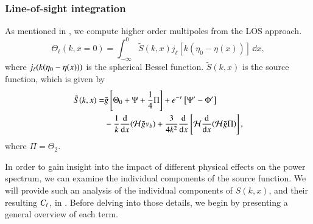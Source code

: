 \subsubsection{Line-of-sight integration}\label{sssec:M4:theory:line_of_sight_integration}
As mentioned in , we compute higher order multipoles from the LOS approach. 
\begin{equation} \label{eq:M4:theory:Theta_ell_LOS_integration}
    \Theta_\ell(k,x=0) = \int_{-\infty}^0 \tilde{S}(k,x) j_\ell [k(\eta_0 - \eta(x))]\,\dd x, 
\end{equation}
where $j_\ell(k(\eta_0-\eta(x)))$ is the spherical Bessel function. $\tilde{S}(k,x)$ is the source function, which is given by 
\begin{equation} \label{eq:M4:theory:source_function_LOS}
    \begin{split}
        \tilde{S}(k,x) =& \tilde{g} \left[ \Theta_0 + \Psi + \frac{1}{4} \Pi \right] + e^{-\tau}\left[ \Psi' - \Phi' \right] \\
        & - \frac{1}{k}\dv{x}(\mathcal{H} \tilde{g} v_b) + \frac{3}{4k^2}\dv{x}\left[ \mathcal{H} \dv{x}(\mathcal{H}\tilde{g}\Pi) \right],
    \end{split}
\end{equation}
where $\Pi=\Theta_2$.

In order to gain insight into the impact of different physical effects on the power spectrum, we can examine the individual components of the source function. We will provide such an analysis of the individual components of $S(k,x)$, and their resulting $C_\ell$, in . Before delving into those details, we begin by presenting a general overview of each term.

